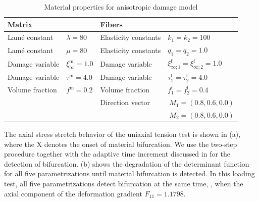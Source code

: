 \documentclass[12pt]{article}
\newcommand{\mtrx}{{\text{m}}}
\newcommand{\fiber}{{\text{f}}}
\numberwithin{equation}{section}
\begin{document}
\begin{table}[htbp]
  \begin{center}
    \begin{tabular}{ l l l l }
      \toprule
      Matrix
      &

      &

      Fibers

      &
      \\
      \midrule
      Lam\'{e} constant
      &
      $\lambda=80$
      &
      Elasticity constants
      &
      $k_1 = k_2 = 100$
      \\
      Lam\'{e} constant
      &
      $\mu = 80$
      &
      Elasticity constants
      &
      $q_1 = q_2 = 1.0$
      \\
      Damage variable
      &
      $\xi^\mtrx_\infty = 1.0$
      &
      Damage variable
      &
      $\xi^\fiber_{\infty;1} = \xi^\fiber_{\infty;2} = 1.0$
      \\
      Damage variable
      &
      $\tau^\mtrx = 4.0$
      &
      Damage variable
      &
      $\tau^\fiber_1 = \tau^\fiber_2 = 4.0$
      \\
      Volume fraction
      &
      $f^\mtrx = 0.2$
      &
      Volume fraction
      &
      $f^\fiber_1 = f^\fiber_2 = 0.4$
      \\
      &

      &
      Direction vector
      &
      $~M_1 = (0.8,0.6,0.0)$
      \\
      &

      &

      &
      $~M_2 = (0.8,0.6,0.0)$
      \\
      \bottomrule
    \end{tabular}
    \caption{Material properties for anisotropic damage model}
    \label{tab:aniso-material}
  \end{center}
\end{table}

The axial stress \vs stretch behavior of the uniaxial tension test is
shown in (a), where the X denotes the
onset of material bifurcation. We use the two-step procedure together
with the adaptive time increment discussed in  for
the detection of bifurcation. (b) shows
the degradation of the determinant function for all five
parametrizations until material bifurcation is detected. In this
loading test, all five parametrizations detect bifurcation at the same
time, \ie, when the axial component of the deformation gradient
$F_{11} = 1.1798$.
\end{document}
